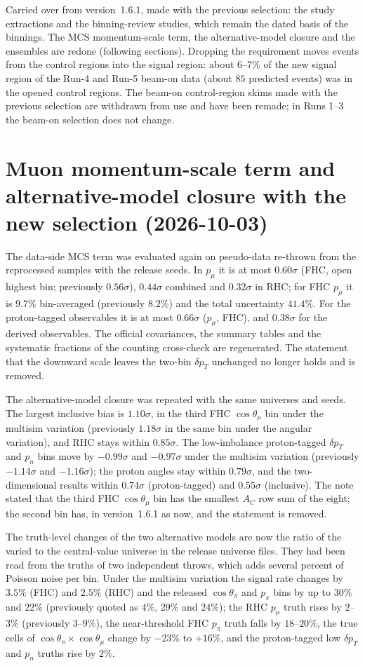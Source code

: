Carried over from version~1.6.1, made with the previous selection: the study extractions and the binning-review
studies, which remain the dated basis of the binnings. The MCS momentum-scale term, the alternative-model closure and
the ensembles are redone (following sections).
Dropping the requirement moves events from the control regions into the signal region: about $6$--$7\%$ of the new
signal region of the Run-4 and Run-5 beam-on data (about $85$ predicted events) was in the opened control regions.
The beam-on control-region skims made with the previous selection are withdrawn from use and have been remade; in
Runs 1--3 the beam-on selection does not change.

\section{Muon momentum-scale term and alternative-model closure with the new selection (2026-10-03)}

The data-side MCS term was evaluated again on pseudo-data re-thrown from the reprocessed samples with the release
seeds. In $p_\mu$ it is at most $0.60\sigma$ (FHC, open highest bin; previously $0.56\sigma$), $0.44\sigma$ combined
and $0.32\sigma$ in RHC; for FHC $p_\mu$ it is $9.7\%$ bin-averaged (previously $8.2\%$) and the total uncertainty
$41.4\%$. For the proton-tagged observables it is at most $0.66\sigma$ ($p_\mu$, FHC), and $0.38\sigma$ for the
derived observables. The official covariances, the summary tables and the systematic fractions of the counting
cross-check are regenerated. The statement that the downward scale leaves the two-bin $\delta p_T$ unchanged no
longer holds and is removed.

The alternative-model closure was repeated with the same universes and seeds. The largest inclusive bias is
$1.10\sigma$, in the third FHC $\cos\theta_\mu$ bin under the multisim variation (previously $1.18\sigma$ in the same
bin under the angular variation), and RHC stays within $0.85\sigma$. The low-imbalance proton-tagged $\delta p_T$ and
$p_n$ bins move by $-0.99\sigma$ and $-0.97\sigma$ under the multisim variation (previously $-1.14\sigma$ and
$-1.16\sigma$); the proton angles stay within $0.79\sigma$, and the two-dimensional results within $0.74\sigma$
(proton-tagged) and $0.55\sigma$ (inclusive). The note stated that the third FHC $\cos\theta_\mu$ bin has the
smallest $A_C$ row sum of the eight; the second bin has, in version~1.6.1 as now, and the statement is removed.

The truth-level changes of the two alternative models are now the ratio of the varied to the central-value
universe in the release universe files. They had been read from the truths of two independent throws, which adds
several percent of Poisson noise per bin. Under the multisim variation the signal rate changes by $3.5\%$ (FHC)
and $2.5\%$ (RHC) and the released $\cos\theta_\pi$ and $p_\pi$ bins by up to $30\%$ and $22\%$ (previously quoted as
$4\%$, $29\%$ and $24\%$); the RHC $p_\mu$ truth rises by $2$--$3\%$ (previously $3$--$9\%$), the near-threshold
FHC $p_\pi$ truth falls by $18$--$20\%$, the true cells of $\cos\theta_\pi\times\cos\theta_\mu$ change by $-23\%$ to
$+16\%$, and the proton-tagged low $\delta p_T$ and $p_n$ truths rise by $2\%$.

